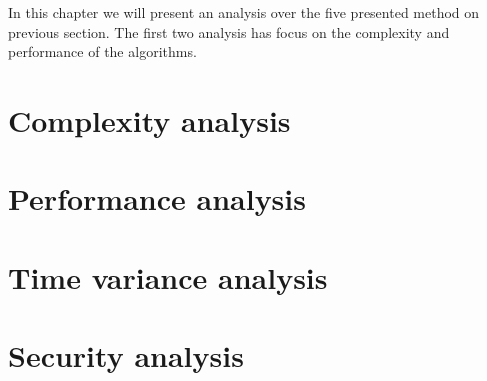 In this chapter we will present an analysis over the five presented method on previous section. The first two analysis has focus on the complexity and performance of the algorithms. 

\section{Complexity analysis}
\section{Performance analysis}
\section{Time variance analysis}
\section{Security analysis}